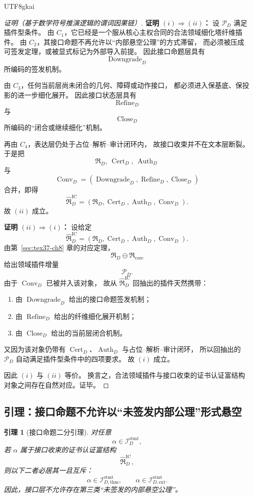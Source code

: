 \documentclass[12pt]{article}
\newtheorem{lemma}{引理}[section]
\newcommand{\Cert}{\operatorname{Cert}}
\newcommand{\Auth}{\operatorname{Auth}}
\newcommand{\Conv}{\operatorname{Conv}}
\newcommand{\Downgrade}{\operatorname{Downgrade}}
\newcommand{\Refine}{\operatorname{Refine}}
\newcommand{\Close}{\operatorname{Close}}
\begin{document}
\begin{CJK*}{UTF8}{gkai}
\begin{proof}[证明（基于数学符号推演逻辑的谓词因果链）]
\textbf{证明 $(i)\Rightarrow(ii)$：}
设 $\mathcal P_D$ 满足插件型条件。
由 $C_1$，它已经是一个服从核心主权合同的合法领域细化塔纤维插件。
由 $C_2$，其接口命题不再允许以“内部悬空公理”的方式滞留，
而必须被压成可签发定理，或被显式标记为外部导入前提。
因此接口命题层具有
\[
  \Downgrade_D
\]
所编码的签发机制。

由 $C_3$，任何当前层尚未闭合的几何、障碍或动作接口，
都必须进入保基底、保投影的进一步细化展开。
因此接口状态层具有
\[
  \Refine_D
\]
与
\[
  \Close_D
\]
所编码的“闭合或继续细化”机制。

再由 $C_4$，表达层仍处于占位--解析--审计闭环内，
故接口收束并不在文本层断裂。
于是把
\[
  \mathfrak R_D,\ \Cert_D,\ \Auth_D
\]
与
\[
  \Conv_D=(\Downgrade_D,\Refine_D,\Close_D)
\]
合并，即得
\[
  \widehat{\mathfrak R}_D^{\mathrm{IC}}
  =
  (\mathfrak R_D,\Cert_D,\Auth_D,\Conv_D).
\]
故 $(ii)$ 成立。

\textbf{证明 $(ii)\Rightarrow(i)$：}
设给定
\[
  \widehat{\mathfrak R}_D^{\mathrm{IC}}
  =
  (\mathfrak R_D,\Cert_D,\Auth_D,\Conv_D).
\]
由第~\ref{sec:tex37-ch8} 章的对应定理，
\[
  \mathfrak R_D\ominus \mathfrak R_{\mathrm{core}}
\]
给出领域插件增量
\[
  \mathcal P_D.
\]
由于 $\Conv_D$ 已被并入该对象，
故从 $\widehat{\mathfrak R}_D^{\mathrm{IC}}$ 回抽出的插件天然携带：
\begin{enumerate}
  \item 由 $\Downgrade_D$ 给出的接口命题签发机制；
  \item 由 $\Refine_D$ 给出的纤维细化展开机制；
  \item 由 $\Close_D$ 给出的当前层闭合机制。
\end{enumerate}
又因为该对象仍带有 $\Cert_D$、$\Auth_D$ 与占位--解析--审计闭环，
所以回抽出的 $\mathcal P_D$ 自动满足插件型条件中的四项要求。
故 $(i)$ 成立。

因此 $(i)$ 与 $(ii)$ 等价。
换言之，合法领域插件与接口收束的证书认证富结构对象之间存在自然对应。证毕。
\end{proof}

\subsection{引理：接口命题不允许以“未签发内部公理”形式悬空}
\label{subsec:tex37-ch9-lemma}

\begin{lemma}[接口命题二分引理]
\label{lem:tex37-ch9-statement-split}
对任意
\[
  \alpha\in \mathcal I_D^{\mathrm{stmt}},
\]
若 $\alpha$ 属于接口收束的证书认证富结构
\[
  \widehat{\mathfrak R}_D^{\mathrm{IC}},
\]
则以下二者必居其一且互斥：
\[
  \alpha\in \mathcal I_{D,\mathrm{thm}}^{\mathrm{stmt}},
  \qquad
  \alpha\in \mathcal I_{D,\mathrm{ext}}^{\mathrm{stmt}}.
\]
因此，接口层不允许存在第三类“未签发的内部悬空公理”。
\end{lemma}


\end{CJK*}
\end{document}
